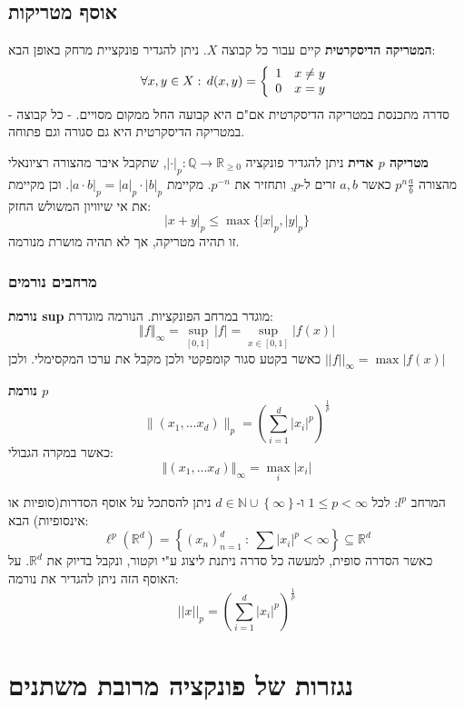 \documentclass{tstextbook}
\begin{document}
\section{אוסף מטריקות}

\textbf{המטריקה הדיסקרטית}
קיים עבור כל קבוצה \(X\). ניתן להגדיר פונקציית מרחק באופן הבא:
$$\forall x,y\in X:\,d(x,y)={\left\{\begin{array}{l l}{1}&{x\neq y}\\ {0}&{x=y}\end{array}\right.}$$
- סדרה מתכנסת במטריקה הדיסקרטית אם"ם היא קבועה החל ממקום מסויים.
- כל קבוצה במטריקה הדיסקרטית היא גם סגורה וגם פתוחה.

\textbf{מטריקה \(p\) אדית}
ניתן להגדיר פונקציה \(|\cdot|_{p}:\mathbb{Q}\to \mathbb{R}_{\geq 0}\), שתקבל איבר מהצורה רציונאלי מהצורה \(p^n \frac{a}{b}\) כאשר \(a,b\) זרים ל-\(p\), ותחזיר את \(p^{-n}\). מקיימת \(|a\cdot b|_{p}=|a|_{p}\cdot |b|_{p}\). וכן מקיימת את אי שיוויון המשולש החזק:
$$|x+y|_{p}\leq \max \{ |x|_{p},|y|_{p} \}$$
זו תהיה מטריקה, אך לא תהיה מושרת מנורמה.

\subsection{מרחבים נורמים}

\textbf{נורמת sup}
מוגדר במרחב הפונקציות. הנורמה מוגדרת:
$$\left\Vert{f}\right\Vert_{\infty}=\operatorname*{sup}_{[0,1]}\left\vert{f}\right\vert=\operatorname*{sup}_{x\in[0,1]}\left\vert{f}\left(x\right)\right\vert$$
כאשר בקטע סגור קומפקטי ולכן מקבל את ערכו המקסימלי. ולכן \(||f||_{\infty}=\max|f(x)|\)

\textbf{נורמת \(p\)}$$\|(x_{1},...x_{d})\|_{p}=\left(\sum_{i=1}^{d}|x_{i}|^{p}\right)^{\frac{1}{p}}$$
כאשר במקרה הגבולי:
$$\left\Vert(x_{1},...x_{d})\right\Vert_{\infty}=\operatorname*{max}_{i}\left\vert x_{i}\right\vert$$

המרחב \(l^p\):
לכל \(1\leq p<\infty\) ו-\(d\in\mathbb{N}\cup \left\{  \infty  \right\}\) ניתן להסתכל על אוסף הסדרות(סופיות או אינסופיות) הבא:
$$\ell^{p}\left(\mathbb{R}^{d}\right)=\left\{\left(x_{n}\right)_{n=1}^{d}\ :\ \sum|x_{i}|^{p}<\infty\right\}\subseteq\mathbb{R}^{d}$$
כאשר הסדרה סופית, למעשה כל סדרה ניתנת ליצוג ע"י וקטור, ונקבל בדיוק את \(\mathbb{R}^d\). על האוסף הזה ניתן להגדיר את נורמה:
$$||x||_{p}=\left(\sum_{i=1}^{d}|x_{i}|^{p}\right)^{\frac{1}{p}}$$

\chapter{נגזרות של פונקציה מרובת משתנים}
\end{document}
